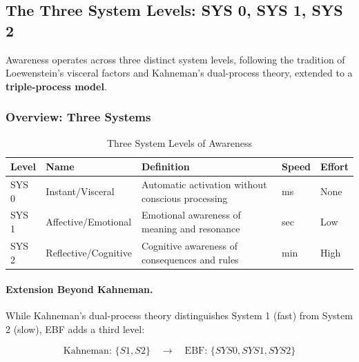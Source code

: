 \subsection{The Three System Levels: SYS 0, SYS 1, SYS 2}
\label{subsec:11-3-system-levels}


Awareness operates across three distinct system levels, following the tradition
of Loewenstein's visceral factors and Kahneman's dual-process theory, extended
to a \textbf{triple-process model}.

\subsubsection{Overview: Three Systems}

\begin{table}[htbp]
\centering
\caption{Three System Levels of Awareness}
\label{tab:system-levels-overview}
\renewcommand{\arraystretch}{1.4}
\begin{tabular}{@{}lllll@{}}
\toprule
\textbf{Level} & \textbf{Name} & \textbf{Definition} & \textbf{Speed} & \textbf{Effort} \\
\midrule
SYS 0 & Instant/Visceral & Automatic activation without conscious processing & ms & None \\
SYS 1 & Affective/Emotional & Emotional awareness of meaning and resonance & sec & Low \\
SYS 2 & Reflective/Cognitive & Cognitive awareness of consequences and rules & min & High \\
\bottomrule
\end{tabular}
\end{table}

\paragraph{Extension Beyond Kahneman.}
While Kahneman's dual-process theory distinguishes System 1 (fast) from 
System 2 (slow), EBF adds a third level:

\begin{equation}
\text{Kahneman: } \{S1, S2\} \quad \rightarrow \quad \text{EBF: } \{SYS0, SYS1, SYS2\}
\end{equation}

